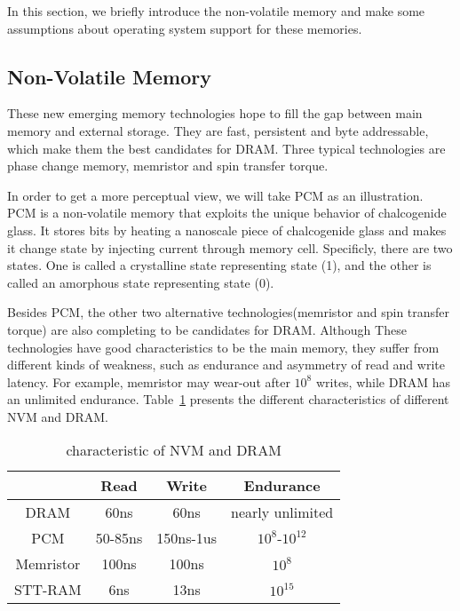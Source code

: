 \documentclass[10pt, conference, compsocconf]{IEEEtran}
\begin{document}
In this section, we briefly introduce the non-volatile memory and
make some assumptions about operating system support for these memories.

\subsection{Non-Volatile Memory}

These new emerging memory technologies hope to fill the gap between main memory and external storage.
They are fast, persistent and byte addressable, which make them the best candidates for DRAM.
Three typical technologies are phase change memory, memristor and spin transfer torque.

In order to get a more perceptual view, we will take PCM as an illustration. 
PCM is a non-volatile memory that exploits the unique behavior of chalcogenide glass.
It stores bits by heating a nanoscale piece of chalcogenide glass and makes it change state by injecting current through memory cell.
Specificly, there are two states.
One is called a crystalline state representing state (1), and the other is called an amorphous state representing state (0).

Besides PCM, the other two alternative technologies(memristor and spin transfer torque) are also completing to be candidates for DRAM.
Although These technologies have good characteristics to be the main memory,
they suffer from different kinds of weakness, such as endurance and asymmetry of read and write latency. 
For example, memristor may wear-out after $10^8$ writes, while DRAM has an unlimited endurance.
Table~\ref{tab:NVMvsDRAM} presents the different characteristics of different NVM and DRAM.

\begin{table}[h]
    \centering
    \begin{tabular}{|c|c|c|c|} \hline
        & Read & Write & Endurance\\ \hline
        DRAM & 60ns & 60ns & nearly unlimited\\ \hline
        PCM & 50-85ns & 150ns-1us & $10^8$-$10^{12}$\\ \hline
        Memristor & 100ns & 100ns & $10^8$\\ \hline
        STT-RAM & 6ns & 13ns & $10^{15}$\\ \hline
    \end{tabular}
    \caption{characteristic of NVM and DRAM}
\label{tab:NVMvsDRAM}
\end{table}
\end{document}
